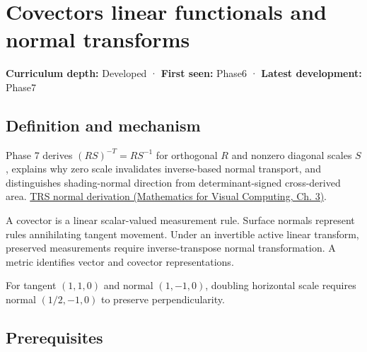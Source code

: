 \hypertarget{appendix-46da295c6787}{}\label{referencestart:appendix-46da295c6787}
\section{Covectors linear functionals and normal transforms}\label{appendix-46da295c6787-covectors-linear-functionals-and-normal-transforms}

\hypertarget{appendix-46da295c6787-covectors-linear-functionals-and-normal-transforms}{}

\textbf{Curriculum depth:} Developed · \textbf{First seen:} Phase6 · \textbf{Latest development:} Phase7

\begin{allmightroledefinition}

\subsection{Definition and mechanism}\label{appendix-46da295c6787-definition-and-mechanism}

\hypertarget{appendix-46da295c6787-definition-and-mechanism}{}

Phase 7 derives \((RS)^{-T}=RS^{-1}\) for orthogonal \(R\) and nonzero diagonal scales \(S\), explains why zero scale invalidates inverse-based normal transport, and distinguishes shading-normal direction from determinant-signed cross-derived area. \href{../02-Mathematics-for-Visual-Computing/main.pdf\#nameddest=01-foundations-i-ch019-normals-undo-scale-before-following-rotation}{TRS normal derivation (Mathematics for Visual Computing, Ch. 3)}.

\end{allmightroledefinition}

A covector is a linear scalar-valued measurement rule. Surface normals represent rules annihilating tangent movement. Under an invertible active linear transform, preserved measurements require inverse-transpose normal transformation. A metric identifies vector and covector representations.

For tangent \((1,1,0)\) and normal \((1,-1,0)\), doubling horizontal scale requires normal \((1/2,-1,0)\) to preserve perpendicularity.

\subsection{Prerequisites}\label{appendix-46da295c6787-prerequisites}

\hypertarget{appendix-46da295c6787-prerequisites}{}

